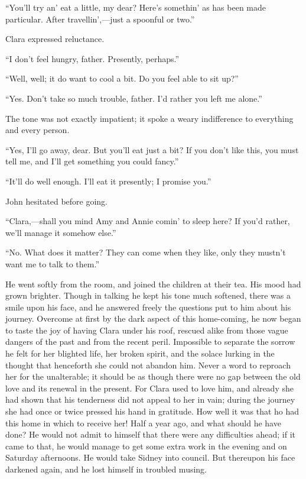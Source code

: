 {\protect\hypertarget{299}{}{}}``You'll try an' eat a little, my dear?
Here's somethin' as has been made particular. After travellin',---just a
spoonful or two.''

Clara expressed reluctance.

``I don't feel hungry, father. Presently, perhaps.''

``Well, well; it do want to cool a bit. Do you feel able to sit up?''

``Yes. Don't take so much trouble, father. I'd rather you left me
alone.''

The tone was not exactly impatient; it spoke a weary indifference to
everything and every person.

``Yes, I'll go away, dear. But you'll eat just a bit? If you don't like
this, you must tell me, and I'll get something you could fancy.''

``It'll do well enough. I'll eat it presently; I promise you.''

John hesitated before going.

``Clara,---shall you mind Amy and Annie comin' to sleep here? If you'd
rather, we'll manage it somehow else.''

``No. What does it matter? They can {\protect\hypertarget{300}{}{}}come
when they like, only they mustn't want me to talk to them.''

He went softly from the room, and joined the children at their tea. His
mood had grown brighter. Though in talking he kept his tone much
softened, there was a smile upon his face, and he answered freely the
questions put to him about his journey. Overcome at first by the dark
aspect of this home-coming, he now began to taste the joy of having
Clara under his roof, rescued alike from those vague dangers of the past
and from the recent peril. Impossible to separate the sorrow he felt for
her blighted life, her broken spirit, and the solace lurking in the
thought that henceforth she could not abandon him. Never a word to
reproach her for the unalterable; it should be as though there were no
gap between the old love and its renewal in the present. For Clara used
to love him, and already she had shown that his tenderness did not
appeal to her in vain; during the journey she had once or twice pressed
his hand in gratitude. How well it {\protect\hypertarget{301}{}{}}was
that ho had this home in which to receive her! Half a year ago, and what
should he have done? He would not admit to himself that there were any
difficulties ahead; if it came to that, he would manage to get some
extra work in the evening and on Saturday afternoons. He would take
Sidney into council. But thereupon his face darkened again, and he lost
himself in troubled musing.

